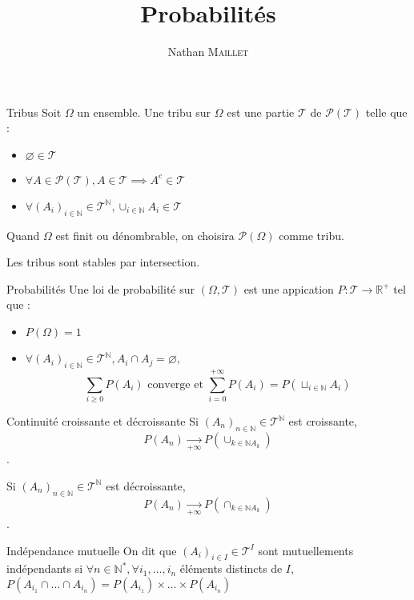 \documentclass[french, a4paper, 10pt, twocolumn]{article}
\title{Probabilités}
\author{Nathan \textsc{Maillet}}
\date{}
\newcommand{\limit}[1]{\underset{#1}{\rightarrow}}  %
\newcommand{\N}{\mathbb{N}}   %
\newcommand{\R}{\mathbb{R}}   %
\begin{document}
\maketitle

\begin{definition}{Tribus}
    Soit \(\Omega\) un ensemble.
    Une tribu sur \(\Omega\) est une partie \(\mathcal{T}\) de \(\mathcal{P(T)}\) telle que :
        \begin{itemize}
            \item \(\varnothing \in \mathcal{T}\)
            \item \(\forall A \in \mathcal{P(T)}, A \in \mathcal{T} \implies A^c \in  \mathcal{T}\)
            \item \(\forall (A_i)_{i\in \N} \in \mathcal{T}^{\N}, \cup_{i\in \N}A_i \in \mathcal{T}\)
        \end{itemize}
    \tcblower
    Quand \(\Omega\) est finit ou dénombrable, on choisira \(\mathcal{P(\Omega)}\) comme tribu.

    Les tribus sont stables par intersection.
\end{definition}

\begin{definition}{Probabilités}
    Une loi de probabilité sur $(\Omega,\mathcal{T})$ est une appication \(P : \mathcal{T} \rightarrow \R^+\) tel que :
    \begin{itemize}
        \item \(P(\Omega)=1\)
        \item \(\forall (A_i)_{i\in \N} \in \mathcal{T}^{\N}, A_i\cap A_j =\varnothing,\)
        \[\sum_{i\geq 0}^{}P(A_i) \text{ converge et } \sum_{i=0}^{+\infty}P(A_i)=P(\sqcup_{i\in \N}A_i)\] 
    \end{itemize}
\end{definition}

\begin{theoreme}{Continuité croissante et décroissante}
    Si \((A_n)_{n\in \N} \in \mathcal{T}^{\N}\) est croissante, \[P(A_n)\limit{+\infty}P(\cup_{k\in \N A_k})\].
    
    Si \((A_n)_{n\in \N} \in \mathcal{T}^{\N}\) est décroissante, \[P(A_n)\limit{+\infty}P(\cap_{k\in \N A_k})\].
\end{theoreme}

\begin{definition}{Indépendance mutuelle}
    On dit que \((A_i)_{i \in I} \in \mathcal{T}^I\) sont mutuellements indépendants si \(\forall n \in \N^*, \forall i_1,\dots,i_n\)
    éléments distincts de \(I\), \(P(A_{i_1}\cap\dots\cap A_{i_n})=P(A_{i_1})\times\dots\times P(A_{i_n})\)
\end{definition}
\end{document}
